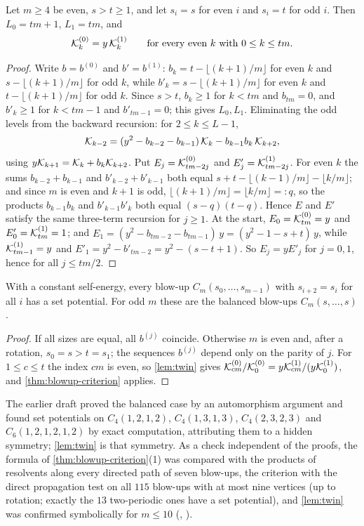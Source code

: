 \begin{lemma}\label{lem:twin}
Let $m\ge4$ be even, $s>t\ge1$, and let $s_i=s$ for even $i$ and $s_i=t$ for odd $i$. Then $L_0=tm+1$, $L_1=tm$, and
\[
\mathcal{K}^{(0)}_k=y\,\mathcal{K}^{(1)}_k\qquad\text{for every even }k\text{ with }0\le k\le tm.
\]
\end{lemma}
\begin{proof}
Write $b=b^{(0)}$ and $b'=b^{(1)}$: $b_k=t-\lfloor(k+1)/m\rfloor$ for even $k$ and $s-\lfloor(k+1)/m\rfloor$ for odd $k$, while $b'_k=s-\lfloor(k+1)/m\rfloor$ for even $k$ and $t-\lfloor(k+1)/m\rfloor$ for odd $k$. Since $s>t$, $b_k\ge1$ for $k<tm$ and $b_{tm}=0$, and $b'_k\ge1$ for $k<tm-1$ and $b'_{tm-1}=0$; this gives $L_0,L_1$. Eliminating the odd levels from the backward recursion: for $2\le k\le L-1$,
\[
\mathcal{K}_{k-2}=(y^{2}-b_{k-2}-b_{k-1})\,\mathcal{K}_k-b_{k-1}b_k\,\mathcal{K}_{k+2},
\]
using $y\mathcal{K}_{k+1}=\mathcal{K}_k+b_k\mathcal{K}_{k+2}$. Put $E_j=\mathcal{K}^{(0)}_{tm-2j}$ and $E'_j=\mathcal{K}^{(1)}_{tm-2j}$. For even $k$ the sums $b_{k-2}+b_{k-1}$ and $b'_{k-2}+b'_{k-1}$ both equal $s+t-\lfloor(k-1)/m\rfloor-\lfloor k/m\rfloor$; and since $m$ is even and $k+1$ is odd, $\lfloor(k+1)/m\rfloor=\lfloor k/m\rfloor=:q$, so the products $b_{k-1}b_k$ and $b'_{k-1}b'_k$ both equal $(s-q)(t-q)$. Hence $E$ and $E'$ satisfy the same three-term recursion for $j\ge1$. At the start, $E_0=\mathcal{K}^{(0)}_{tm}=y$ and $E'_0=\mathcal{K}^{(1)}_{tm}=1$; and $E_1=(y^{2}-b_{tm-2}-b_{tm-1})\,y=(y^{2}-1-s+t)\,y$, while $\mathcal{K}^{(1)}_{tm-1}=y$ and $E'_1=y^{2}-b'_{tm-2}=y^{2}-(s-t+1)$. So $E_j=yE'_j$ for $j=0,1$, hence for all $j\le tm/2$.
\end{proof}

\begin{corollary}\label{cor:two-periodic}
With a constant self-energy, every blow-up $C_m(s_0,\dots,s_{m-1})$ with $s_{i+2}=s_i$ for all $i$ has a set potential. For odd $m$ these are the balanced blow-ups $C_m(s,\dots,s)$.
\end{corollary}
\begin{proof}
If all sizes are equal, all $b^{(j)}$ coincide. Otherwise $m$ is even and, after a rotation, $s_0=s>t=s_1$; the sequences $b^{(j)}$ depend only on the parity of $j$. For $1\le c\le t$ the index $cm$ is even, so \cref{lem:twin} gives $\mathcal{K}^{(0)}_{cm}/\mathcal{K}^{(0)}_0=y\mathcal{K}^{(1)}_{cm}/(y\mathcal{K}^{(1)}_0)$, and \cref{thm:blowup-criterion} applies.
\end{proof}

The earlier draft proved the balanced case by an automorphism argument and found set potentials on $C_4(1,2,1,2)$, $C_4(1,3,1,3)$, $C_4(2,3,2,3)$ and $C_6(1,2,1,2,1,2)$ by exact computation, attributing them to a hidden symmetry; \cref{lem:twin} is that symmetry. As a check independent of the proofs, the formula of \cref{thm:blowup-criterion}(1) was compared with the products of resolvents along every directed path of seven blow-ups, the criterion with the direct propagation test on all $115$ blow-ups with at most nine vertices (up to rotation; exactly the $13$ two-periodic ones have a set potential), and \cref{lem:twin} was confirmed symbolically for $m\le10$ (, ).

